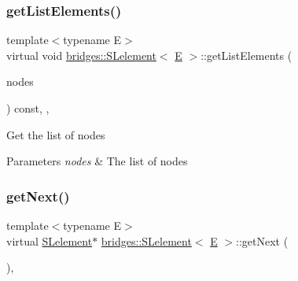 \subsubsection{\texorpdfstring{getListElements()}{getListElements()}}
{\footnotesize\ttfamily template$<$typename E$>$ \\
virtual void \mbox{\hyperlink{classbridges_1_1_s_lelement}{bridges\+::\+S\+Lelement}}$<$ \mbox{\hyperlink{namespacebridges_acfb0a4f7877d8f63de3e6862004c50eda3a3ea00cfc35332cedf6e5e9a32e94da}{E}} $>$\+::get\+List\+Elements (\begin{DoxyParamCaption}\item[{vector$<$ const \mbox{\hyperlink{classbridges_1_1_s_lelement}{S\+Lelement}}$<$ \mbox{\hyperlink{namespacebridges_acfb0a4f7877d8f63de3e6862004c50eda3a3ea00cfc35332cedf6e5e9a32e94da}{E}} $>$ $\ast$ $>$ \&}]{nodes }\end{DoxyParamCaption}) const\hspace{0.3cm}{\ttfamily [inline]}, {\ttfamily [protected]}, {\ttfamily [virtual]}}

Get the list of nodes


\begin{DoxyParams}{Parameters}
{\em nodes} & The list of nodes \\
\hline
\end{DoxyParams}
\mbox{\label{classbridges_1_1_s_lelement_a5bd74108a9aa49339378bf62cdbb19ca}} 
\subsubsection{\texorpdfstring{getNext()}{getNext()}\hspace{0.1cm}{\footnotesize\ttfamily [1/2]}}
{\footnotesize\ttfamily template$<$typename E$>$ \\
virtual \mbox{\hyperlink{classbridges_1_1_s_lelement}{S\+Lelement}}$\ast$ \mbox{\hyperlink{classbridges_1_1_s_lelement}{bridges\+::\+S\+Lelement}}$<$ \mbox{\hyperlink{namespacebridges_acfb0a4f7877d8f63de3e6862004c50eda3a3ea00cfc35332cedf6e5e9a32e94da}{E}} $>$\+::get\+Next (\begin{DoxyParamCaption}{ }\end{DoxyParamCaption})\hspace{0.3cm}{\ttfamily [inline]}, {\ttfamily [virtual]}}

